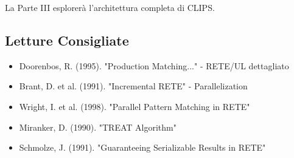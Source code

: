 La Parte III esplorerà l'architettura completa di CLIPS.

\subsection{Letture Consigliate}

\begin{itemize}
\item Doorenbos, R. (1995). "Production Matching..." - RETE/UL dettagliato
\item Brant, D. et al. (1991). "Incremental RETE" - Parallelization
\item Wright, I. et al. (1998). "Parallel Pattern Matching in RETE"
\item Miranker, D. (1990). "TREAT Algorithm"
\item Schmolze, J. (1991). "Guaranteeing Serializable Results in RETE"
\end{itemize}
